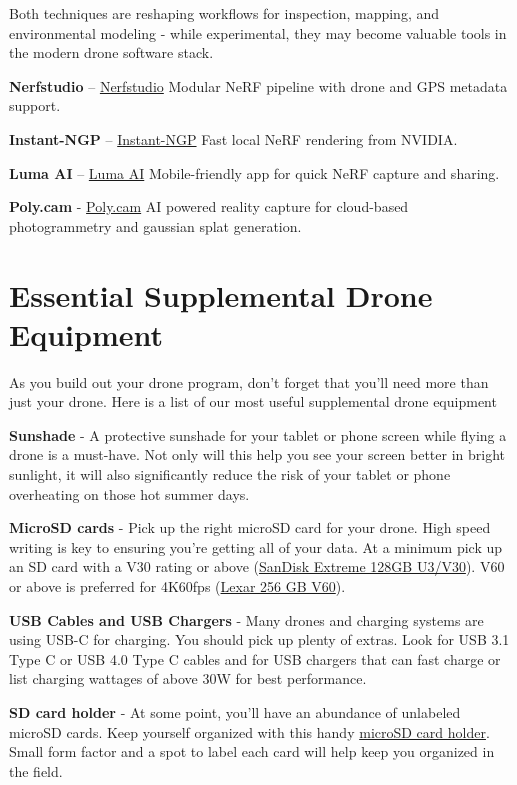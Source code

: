 \documentclass[
  12pt,
]{book}
\begin{document}
Both techniques are reshaping workflows for inspection, mapping, and environmental modeling - while experimental, they may become valuable tools in the modern drone software stack.

\textbf{Nerfstudio} -- \href{https://docs.nerf.studio/}{Nerfstudio} Modular NeRF pipeline with drone and GPS metadata support.

\textbf{Instant-NGP} -- \href{https://github.com/NVlabs/instant-ngp}{Instant-NGP} Fast local NeRF rendering from NVIDIA.

\textbf{Luma AI} -- \href{https://lumalabs.ai/}{Luma AI} Mobile-friendly app for quick NeRF capture and sharing.

\textbf{Poly.cam} - \href{https://poly.cam/}{Poly.cam} AI powered reality capture for cloud-based photogrammetry and gaussian splat generation.

\section{Essential Supplemental Drone Equipment}\label{essential-supplemental-drone-equipment}

As you build out your drone program, don't forget that you'll need more than just your drone. Here is a list of our most useful supplemental drone equipment

\textbf{Sunshade} - A protective sunshade for your tablet or phone screen while flying a drone is a must-have. Not only will this help you see your screen better in bright sunlight, it will also significantly reduce the risk of your tablet or phone overheating on those hot summer days.

\textbf{MicroSD cards} - Pick up the right microSD card for your drone. High speed writing is key to ensuring you're getting all of your data. At a minimum pick up an SD card with a V30 rating or above (\href{https://www.amazon.com/SanDisk-Extreme-microSDXC-Memory-Adapter/dp/B07FCMKK5X?th=1}{SanDisk Extreme 128GB U3/V30}). V60 or above is preferred for 4K60fps (\href{https://www.amazon.com/Lexar-microSDXC-Professional-Adapter-Class10/dp/B09FJHMLC6/}{Lexar 256 GB V60}).

\textbf{USB Cables and USB Chargers} - Many drones and charging systems are using USB-C for charging. You should pick up plenty of extras. Look for USB 3.1 Type C or USB 4.0 Type C cables and for USB chargers that can fast charge or list charging wattages of above 30W for best performance.

\textbf{SD card holder} - At some point, you'll have an abundance of unlabeled microSD cards. Keep yourself organized with this handy \href{https://www.amazon.com/Holder-Storage-Organizer-Lightweight-Portable/dp/B07T6SWXK5/}{microSD card holder}. Small form factor and a spot to label each card will help keep you organized in the field.
\end{document}
